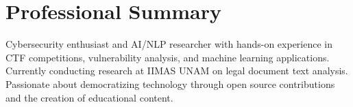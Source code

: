 
\section{Professional Summary}
Cybersecurity enthusiast and AI/NLP researcher with hands-on experience in CTF competitions, vulnerability analysis, and machine learning applications. Currently conducting research at IIMAS UNAM on legal document text analysis. Passionate about democratizing technology through open source contributions and the creation of educational content.